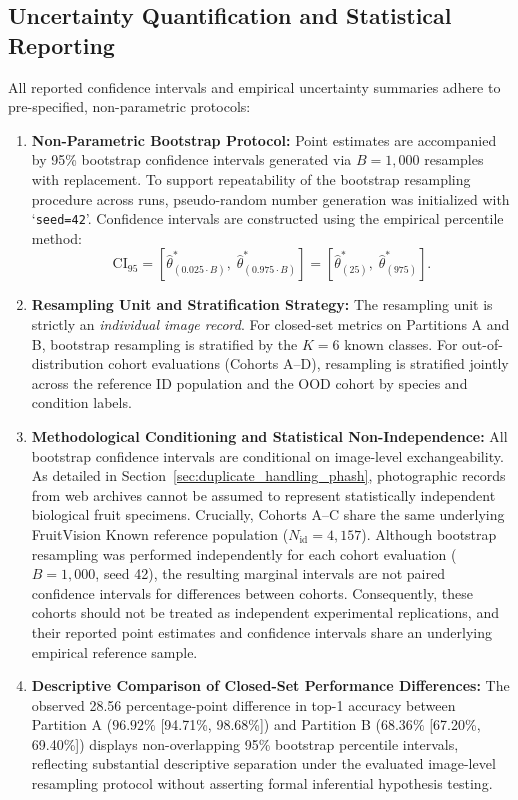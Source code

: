\subsection{Uncertainty Quantification and Statistical Reporting}
\label{sec:uncertainty_quantification}

All reported confidence intervals and empirical uncertainty summaries adhere to pre-specified, non-parametric protocols:
\begin{enumerate}
\item \textbf{Non-Parametric Bootstrap Protocol:} Point estimates are accompanied by 95\% bootstrap confidence intervals generated via $B = 1,000$ resamples with replacement. To support repeatability of the bootstrap resampling procedure across runs, pseudo-random number generation was initialized with `\texttt{seed=42}'. Confidence intervals are constructed using the empirical percentile method:
\begin{equation}
\text{CI}_{95} = \left[ \hat{\theta}^*_{(0.025 \cdot B)}, \; \hat{\theta}^*_{(0.975 \cdot B)} \right] = \left[ \hat{\theta}^*_{(25)}, \; \hat{\theta}^*_{(975)} \right].
\end{equation}
\item \textbf{Resampling Unit and Stratification Strategy:} The resampling unit is strictly an \textit{individual image record}. For closed-set metrics on Partitions A and B, bootstrap resampling is stratified by the $K = 6$ known classes. For out-of-distribution cohort evaluations (Cohorts A--D), resampling is stratified jointly across the reference ID population and the OOD cohort by species and condition labels.
\item \textbf{Methodological Conditioning and Statistical Non-Independence:} All bootstrap confidence intervals are conditional on image-level exchangeability. As detailed in Section~\ref{sec:duplicate_handling_phash}, photographic records from web archives cannot be assumed to represent statistically independent biological fruit specimens. Crucially, Cohorts A--C share the same underlying FruitVision Known reference population ($N_{\text{id}} = 4,157$). Although bootstrap resampling was performed independently for each cohort evaluation ($B = 1,000$, seed 42), the resulting marginal intervals are not paired confidence intervals for differences between cohorts. Consequently, these cohorts should not be treated as independent experimental replications, and their reported point estimates and confidence intervals share an underlying empirical reference sample.
\item \textbf{Descriptive Comparison of Closed-Set Performance Differences:} The observed 28.56 percentage-point difference in top-1 accuracy between Partition A ($96.92\%$ [94.71\%, 98.68\%]) and Partition B ($68.36\%$ [67.20\%, 69.40\%]) displays non-overlapping 95\% bootstrap percentile intervals, reflecting substantial descriptive separation under the evaluated image-level resampling protocol without asserting formal inferential hypothesis testing.
\end{enumerate}

